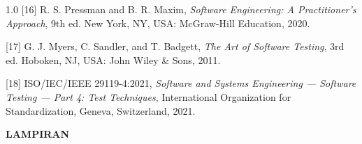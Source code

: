 \documentclass[12pt, a4paper, onecolumn, oneside]{report}
\begin{document}
\begin{spacing}{1.0}
\vspace{0.3cm}
\noindent\hangindent=1.5cm
{[16]} R. S. Pressman and B. R. Maxim, \textit{Software Engineering: A Practitioner's Approach}, 9th ed. New York, NY, USA: McGraw-Hill Education, 2020.

\vspace{0.3cm}
\noindent\hangindent=1.5cm
{[17]} G. J. Myers, C. Sandler, and T. Badgett, \textit{The Art of Software Testing}, 3rd ed. Hoboken, NJ, USA: John Wiley \& Sons, 2011.

\vspace{0.3cm}
\noindent\hangindent=1.5cm
{[18]} ISO/IEC/IEEE 29119-4:2021, \textit{Software and Systems Engineering --- Software Testing --- Part 4: Test Techniques}, International Organization for Standardization, Geneva, Switzerland, 2021.

\end{spacing}

\newpage
\thispagestyle{empty}
{}
\vspace*{\fill}
\begin{center}
{\fontsize{14pt}{16pt}\selectfont\bfseries LAMPIRAN}
\end{center}
\vspace*{\fill}


\newpage

\end{document}

